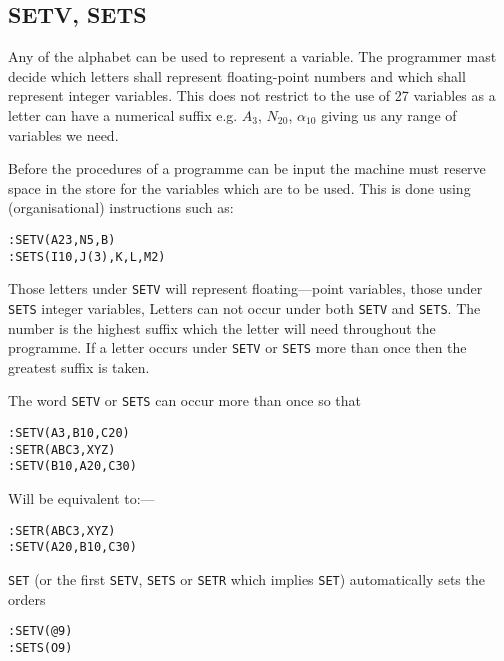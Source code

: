 \documentclass[10pt, a4paper, oneside]{article}
\newcommand{\mytt}[1]{\texttt{\scriptsize #1}}
\newcommand{\mytt}[1]{\texttt{\small #1}}
\begin{document}
\begin{multicols}{2}
\subsection{SETV, SETS}

Any of the alphabet can be used to represent
a variable.  The programmer mast decide which letters
shall represent floating-point numbers and which shall
represent integer variables.  This does not restrict
to the use of 27 variables as a letter can have a
numerical suffix e.g. $A_{3}$, $N_{20}$, $\alpha _{10}$ giving us any
range of variables we need.

Before the procedures of a programme can be
input the machine must reserve space in the store
for the variables which are to be used.  This is done
using (organisational) instructions such as:

\begin{addmargin}[1cm]{1em}%
\begin{lstlisting}
:SETV(A23,N5,B)
:SETS(I10,J(3),K,L,M2)
\end{lstlisting}
\end{addmargin}

Those letters under \mytt{SETV} will represent floating—point
variables, those under \mytt{SETS} integer variables,
Letters can not occur under both \mytt{SETV} and \mytt{SETS}.  The
number is the highest suffix which the letter will need
throughout the programme.  If a letter occurs under
\mytt{SETV} or \mytt{SETS} more than once then the greatest suffix
is taken.

The word \mytt{SETV} or \mytt{SETS} can occur more than once
so that

\begin{addmargin}[1cm]{1em}%
\begin{lstlisting}
:SETV(A3,B10,C20)
:SETR(ABC3,XYZ)
:SETV(B10,A20,C30)
\end{lstlisting}
\end{addmargin}

Will be equivalent to:—

\begin{addmargin}[1cm]{1em}%
\begin{lstlisting}
:SETR(ABC3,XYZ)
:SETV(A20,B10,C30)
\end{lstlisting}
\end{addmargin}

\mytt{SET} (or the first \mytt{SETV}, \mytt{SETS} or \mytt{SETR} which
implies \mytt{SET}) automatically sets the orders

\begin{addmargin}[1cm]{1em}%
\begin{lstlisting}
:SETV(@9)
:SETS(O9)
\end{lstlisting}
\end{addmargin}


\end{multicols}
\end{document}
